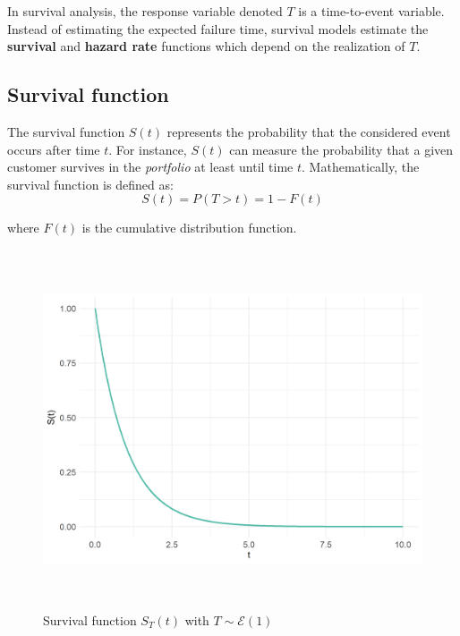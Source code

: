 \documentclass[
]{book}
\begin{document}
In survival analysis, the response variable denoted \(T\) is a time-to-event variable. Instead of estimating the expected failure time, survival models estimate the \textbf{survival} and \textbf{hazard rate} functions which depend on the realization of \(T\).

\hypertarget{survival-function}{%
\subsection{Survival function}\label{survival-function}}

The survival function \(S(t)\) represents the probability that the considered event occurs after time \(t\). For instance, \(S(t)\) can measure the probability that a given customer survives in the \emph{portfolio} at least until time \(t\). Mathematically, the survival function is defined as:
\begin{equation}
  S(t) = P(T > t) = 1 - F(t)
  \label{eq:survfun}
\end{equation}

where \(F(t)\) is the cumulative distribution function.

\begin{figure}

{\centering \includegraphics[width=400pt,height=300pt]{./imgs/surv_fun_plot} 

}

\caption{Survival function $S_T(t)$ with $T \sim \mathcal{E} (1)$}\label{fig:survfunplot}
\end{figure}
\end{document}
